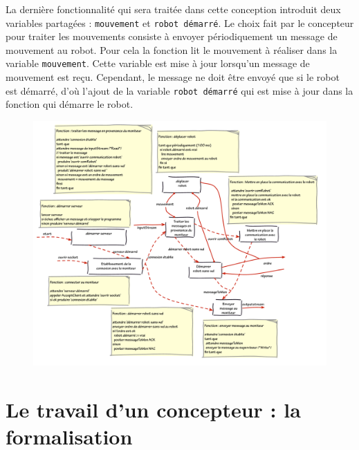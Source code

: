\documentclass[11pt,a4paper]{paper}
\begin{document}
La dernière fonctionnalité qui sera traitée dans cette conception introduit deux variables partagées : {\tt mouvement} et {\tt robot démarré}. Le choix fait par le concepteur pour traiter les mouvements consiste à envoyer périodiquement un message de mouvement au robot. Pour cela la fonction lit le mouvement à réaliser dans la variable {\tt mouvement}. Cette variable est mise à jour lorsqu'un message de mouvement est reçu. Cependant, le message ne doit être envoyé que si le robot est démarré, d'où l'ajout de la variable {\tt robot démarré} qui est mise à jour dans la fonction qui démarre le robot.
 \begin{figure}[htbp]
\begin{center}
\includegraphics[scale=0.5]{figures_pdf/fonc/fonc12}
\end{center}
\end{figure}
\FloatBarrier

\section{Le travail d'un concepteur : la formalisation}
\end{document}
